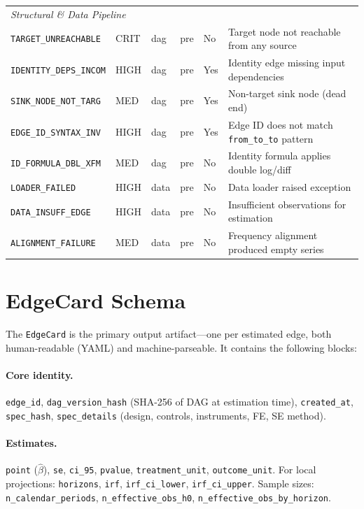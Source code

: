 \documentclass{article}
\begin{document}
\begin{table}[htbp]
\begin{tabular}{@{}lllllp{4.2cm}@{}}
\multicolumn{6}{l}{\textit{Structural \& Data Pipeline}} \\
\texttt{TARGET\_UNREACHABLE} & CRIT & dag & pre & No & Target node not reachable from any source \\
\texttt{IDENTITY\_DEPS\_INCOM} & HIGH & dag & pre & Yes & Identity edge missing input dependencies \\
\texttt{SINK\_NODE\_NOT\_TARG} & MED & dag & pre & Yes & Non-target sink node (dead end) \\
\texttt{EDGE\_ID\_SYNTAX\_INV} & HIGH & dag & pre & Yes & Edge ID does not match \texttt{from\_to\_to} pattern \\
\texttt{ID\_FORMULA\_DBL\_XFM} & MED & dag & pre & No & Identity formula applies double log/diff \\
\texttt{LOADER\_FAILED} & HIGH & data & pre & No & Data loader raised exception \\
\texttt{DATA\_INSUFF\_EDGE} & HIGH & data & pre & No & Insufficient observations for estimation \\
\texttt{ALIGNMENT\_FAILURE} & MED & data & pre & No & Frequency alignment produced empty series \\
\bottomrule
\end{tabular}
\end{table}

\section{EdgeCard Schema}
\label{app:edgecard}

The \texttt{EdgeCard} is the primary output artifact---one per estimated edge, both human-readable (YAML) and machine-parseable. It contains the following blocks:

\paragraph{Core identity.} \texttt{edge\_id}, \texttt{dag\_version\_hash} (SHA-256 of DAG at estimation time), \texttt{created\_at}, \texttt{spec\_hash}, \texttt{spec\_details} (design, controls, instruments, FE, SE method).

\paragraph{Estimates.} \texttt{point} ($\hat{\beta}$), \texttt{se}, \texttt{ci\_95}, \texttt{pvalue}, \texttt{treatment\_unit}, \texttt{outcome\_unit}. For local projections: \texttt{horizons}, \texttt{irf}, \texttt{irf\_ci\_lower}, \texttt{irf\_ci\_upper}. Sample sizes: \texttt{n\_calendar\_periods}, \texttt{n\_effective\_obs\_h0}, \texttt{n\_effective\_obs\_by\_horizon}.
\end{document}
